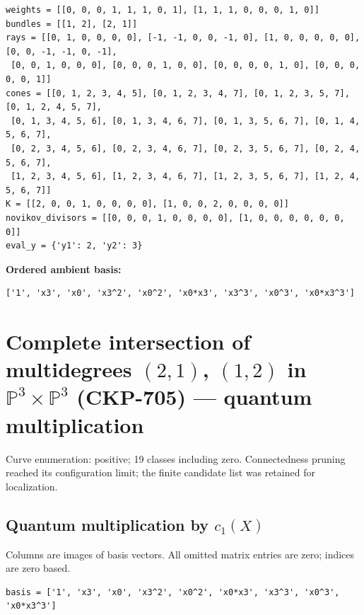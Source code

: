 \documentclass[10pt,a4paper]{article}
\begin{document}
\begin{lstlisting}
weights = [[0, 0, 0, 1, 1, 1, 0, 1], [1, 1, 1, 0, 0, 0, 1, 0]]
bundles = [[1, 2], [2, 1]]
rays = [[0, 1, 0, 0, 0, 0], [-1, -1, 0, 0, -1, 0], [1, 0, 0, 0, 0, 0], [0, 0, -1, -1, 0, -1],
 [0, 0, 1, 0, 0, 0], [0, 0, 0, 1, 0, 0], [0, 0, 0, 0, 1, 0], [0, 0, 0, 0, 0, 1]]
cones = [[0, 1, 2, 3, 4, 5], [0, 1, 2, 3, 4, 7], [0, 1, 2, 3, 5, 7], [0, 1, 2, 4, 5, 7],
 [0, 1, 3, 4, 5, 6], [0, 1, 3, 4, 6, 7], [0, 1, 3, 5, 6, 7], [0, 1, 4, 5, 6, 7],
 [0, 2, 3, 4, 5, 6], [0, 2, 3, 4, 6, 7], [0, 2, 3, 5, 6, 7], [0, 2, 4, 5, 6, 7],
 [1, 2, 3, 4, 5, 6], [1, 2, 3, 4, 6, 7], [1, 2, 3, 5, 6, 7], [1, 2, 4, 5, 6, 7]]
K = [[2, 0, 0, 1, 0, 0, 0, 0], [1, 0, 0, 2, 0, 0, 0, 0]]
novikov_divisors = [[0, 0, 0, 1, 0, 0, 0, 0], [1, 0, 0, 0, 0, 0, 0, 0]]
eval_y = {'y1': 2, 'y2': 3}
\end{lstlisting}

\textbf{Ordered ambient basis:}
\begin{lstlisting}
['1', 'x3', 'x0', 'x3^2', 'x0^2', 'x0*x3', 'x3^3', 'x0^3', 'x0*x3^3']
\end{lstlisting}

\clearpage\section*{Complete intersection of multidegrees $(2,1)$, $(1,2)$ in $\mathbb P^{3}\times \mathbb P^{3}$ (CKP-705) --- quantum multiplication}

Curve enumeration: positive; 19 classes including zero.
Connectedness pruning reached its configuration limit; the finite candidate list was retained for localization.
\subsection*{Quantum multiplication by $c_1(X)$}
Columns are images of basis vectors. All omitted matrix entries are zero; indices are zero based.

\begin{lstlisting}
basis = ['1', 'x3', 'x0', 'x3^2', 'x0^2', 'x0*x3', 'x3^3', 'x0^3', 'x0*x3^3']
\end{lstlisting}
\end{document}
